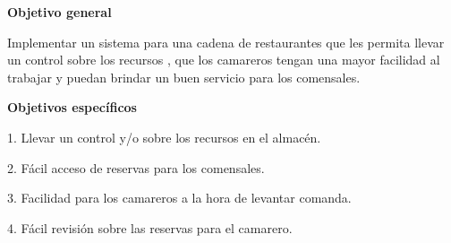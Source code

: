 \documentclass[10pt,a4paper]{report}
\begin{document}

\begin{titlepage}
\begin{flushleft}

{\Large\bfseries \center  Objetivo general \par}
 \vspace{2.5cm}
 \justify
\par Implementar un sistema para una cadena de restaurantes que les permita llevar un control sobre los recursos , que los camareros tengan una mayor facilidad al trabajar y puedan brindar un buen servicio para los comensales.\par 
\vspace{3cm}
 \justify
 
 {\Large\bfseries \center Objetivos específicos \par}
 \vspace{2.5cm}
1. Llevar un control y/o sobre los recursos en el almacén.\par 
2. Fácil acceso de reservas para los comensales. \par
3. Facilidad para los camareros a la hora de levantar comanda.\par 
4. Fácil revisión sobre las reservas para el camarero.\par 
\end{flushleft}
\end{titlepage}

\end{document}
